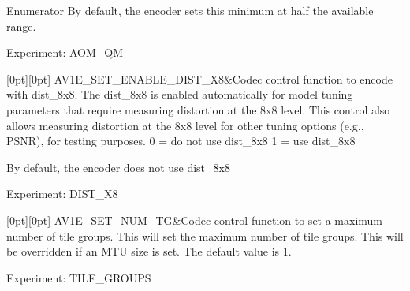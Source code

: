 \begin{DoxyEnumFields}{Enumerator}
By default, the encoder sets this minimum at half the available range.

Experiment\+: A\+O\+M\+\_\+\+QM \\
\hline

[0pt][0pt]{}\mbox{\label{group__aom__encoder_ggae78dde67a6d78f332e9bdba0dde42db5a7ef16c780349c5fee8281f1e5b4a6718}} 
A\+V1\+E\+\_\+\+S\+E\+T\+\_\+\+E\+N\+A\+B\+L\+E\+\_\+\+D\+I\+S\+T\+\_\+X8&Codec control function to encode with dist\+\_\+8x8. The dist\+\_\+8x8 is enabled automatically for model tuning parameters that require measuring distortion at the 8x8 level. This control also allows measuring distortion at the 8x8 level for other tuning options (e.\+g., P\+S\+NR), for testing purposes. 0 = do not use dist\+\_\+8x8 1 = use dist\+\_\+8x8

By default, the encoder does not use dist\+\_\+8x8

Experiment\+: D\+I\+S\+T\+\_\+X8 \\
\hline

[0pt][0pt]{}\mbox{\label{group__aom__encoder_ggae78dde67a6d78f332e9bdba0dde42db5a9ac0044ad63e6848a482db04f0858c44}} 
A\+V1\+E\+\_\+\+S\+E\+T\+\_\+\+N\+U\+M\+\_\+\+TG&Codec control function to set a maximum number of tile groups. This will set the maximum number of tile groups. This will be overridden if an M\+TU size is set. The default value is 1.

Experiment\+: T\+I\+L\+E\+\_\+\+G\+R\+O\+U\+PS \\
\hline


\end{DoxyEnumFields}
